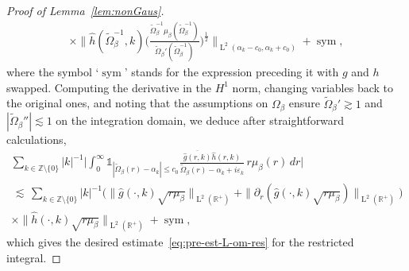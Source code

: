 \documentclass[a4paper,11pt,reqno,noindent]{amsart}
\theoremstyle{plain}
\numberwithin{equation}{section}
\newcommand{\e}{\varepsilon}
\newcommand{\R}{\mathbb R}
\newcommand{\Z}{\mathbb Z}
\newcommand{\sym}{\operatorname{sym}}
\newcommand{\3}{|\!|\!|}
\newcommand{\Ld}{\operatorname{L}}
\begin{document}
\begin{proof}[Proof of Lemma~\ref{lem:nonGaus}]
{\begin{multline*}
\times\bigg\|\hat h(\tilde\Omega_\beta^{-1},k)\Big(\frac{\tilde\Omega_\beta^{-1}\mu_\beta(\tilde\Omega_\beta^{-1})}{\tilde\Omega_\beta'(\tilde\Omega_\beta^{-1})}\Big)^\frac12\bigg\|_{\Ld^2(\alpha_k-c_0,\alpha_k+c_0)}+\sym,
\end{multline*}
where the symbol `$\sym$' stands for the expression preceding it with $g$ and $h$ swapped. Computing the derivative in the $H^1$ norm, changing variables back to the original ones, and noting that the assumptions on $\Omega_\beta$ ensure $\tilde\Omega_\beta'\gtrsim1$ and $|\tilde\Omega_\beta''|\lesssim1$ on the integration domain, we deduce after straightforward calculations,
\begin{multline*}
\sum_{k\in\Z\setminus\{0\}}|k|^{-1}\bigg|\int_0^\infty\mathds1_{|\tilde\Omega_\beta(r)-\alpha_k|\le c_0}\frac{\overline{\hat g(r,k)}\hat h(r,k)}{\tilde\Omega_\beta(r)-\alpha_k+i\e_k}\,r\mu_\beta(r)\,dr\bigg|\\
\,\lesssim\,\sum_{k\in\Z\setminus\{0\}}|k|^{-1}\Big(\|\hat g(\cdot,k)\sqrt{r\mu_\beta}\|_{\Ld^2(\R^+)}+\|\partial_r(\hat g(\cdot,k)\sqrt{r\mu_\beta})\|_{\Ld^2(\R^+)}\Big)\\[-3mm]
\times\|\hat h(\cdot,k)\sqrt{r\mu_\beta}\|_{\Ld^2(\R^+)}
+\sym,
\end{multline*}
which gives the desired estimate~\eqref{eq:pre-est-L-om-res} for the restricted integral.

}
\end{proof}
\end{document}
